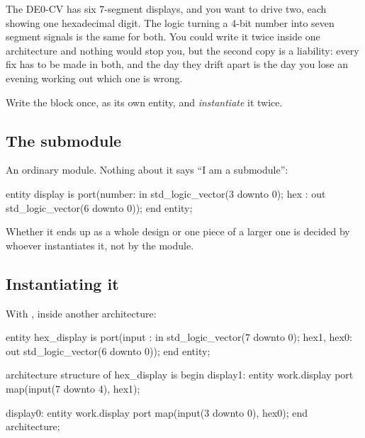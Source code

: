 The DE0-CV has six 7-segment displays, and you want to drive two, each showing one hexadecimal
digit. The logic turning a 4-bit number into seven segment signals is the same for both. You could
write it twice inside one architecture and nothing would stop you, but the second copy is a
liability: every fix has to be made in both, and the day they drift apart is the day you lose an
evening working out which one is wrong.

Write the block once, as its own entity, and \emph{instantiate} it twice.

\subsection{The submodule}
\label{c2:submodule}
An ordinary module. Nothing about it says ``I am a submodule'':

\begin{vhdlcode}
entity display is
    port(number: in  std_logic_vector(3 downto 0);
         hex   : out std_logic_vector(6 downto 0));
end entity;
\end{vhdlcode}

\noindent Whether it ends up as a whole design or one piece of a larger one is decided by whoever
instantiates it, not by the module.

\subsection{Instantiating it}
\label{c2:instantiate}
With , inside another architecture:

\begin{vhdlcode}
entity hex_display is
    port(input     : in  std_logic_vector(7 downto 0);
         hex1, hex0: out std_logic_vector(6 downto 0));
end entity;

architecture structure of hex_display is
begin
    display1: entity work.display
        port map(input(7 downto 4), hex1);

    display0: entity work.display
        port map(input(3 downto 0), hex0);
end architecture;
\end{vhdlcode}


